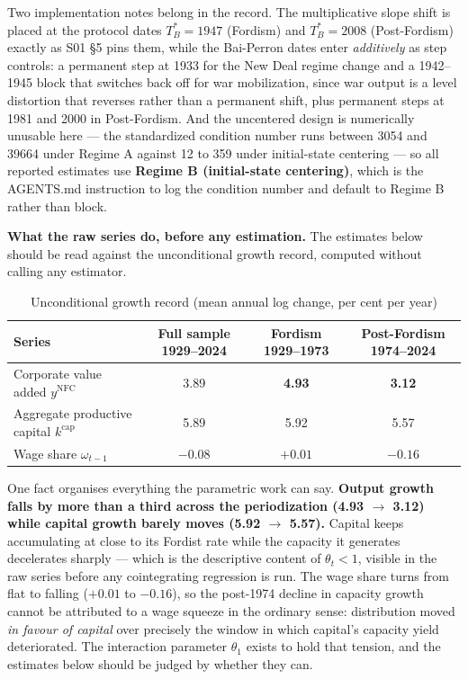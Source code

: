 \documentclass[11pt,a4paper]{article}
\begin{document}
Two implementation notes belong in the record. The multiplicative slope shift is placed at the protocol dates $T_B^* = 1947$ (Fordism) and $T_B^* = 2008$ (Post-Fordism) exactly as S01 \S5 pins them, while the Bai-Perron dates enter \textit{additively} as step controls: a permanent step at 1933 for the New Deal regime change and a 1942--1945 block that switches back off for war mobilization, since war output is a level distortion that reverses rather than a permanent shift, plus permanent steps at 1981 and 2000 in Post-Fordism. And the uncentered design is numerically unusable here --- the standardized condition number runs between 3054 and 39664 under Regime A against 12 to 359 under initial-state centering --- so all reported estimates use \textbf{Regime B (initial-state centering)}, which is the AGENTS.md instruction to log the condition number and default to Regime B rather than block.

\textbf{What the raw series do, before any estimation.} The estimates below should be read against the unconditional growth record, computed without calling any estimator.

\begin{table}[H]
\centering
\caption{Unconditional growth record (mean annual log change, per cent per year)}
\label{tab:specA_descriptive}
\small
\begin{tabular}{p{6.0cm}ccc}
\toprule
Series & Full sample 1929--2024 & Fordism 1929--1973 & Post-Fordism 1974--2024 \\
\midrule
Corporate value added $y^{\text{NFC}}$ & 3.89 & \textbf{4.93} & \textbf{3.12} \\
Aggregate productive capital $k^{\text{cap}}$ & 5.89 & 5.92 & 5.57 \\
Wage share $\omega_{t-1}$ & $-0.08$ & $+0.01$ & $-0.16$ \\
\bottomrule
\end{tabular}
\end{table}

One fact organises everything the parametric work can say. \textbf{Output growth falls by more than a third across the periodization (4.93 $\to$ 3.12) while capital growth barely moves (5.92 $\to$ 5.57).} Capital keeps accumulating at close to its Fordist rate while the capacity it generates decelerates sharply --- which is the descriptive content of $\theta_t < 1$, visible in the raw series before any cointegrating regression is run. The wage share turns from flat to falling ($+0.01$ to $-0.16$), so the post-1974 decline in capacity growth cannot be attributed to a wage squeeze in the ordinary sense: distribution moved \textit{in favour of capital} over precisely the window in which capital's capacity yield deteriorated. The interaction parameter $\theta_1$ exists to hold that tension, and the estimates below should be judged by whether they can.
\end{document}
